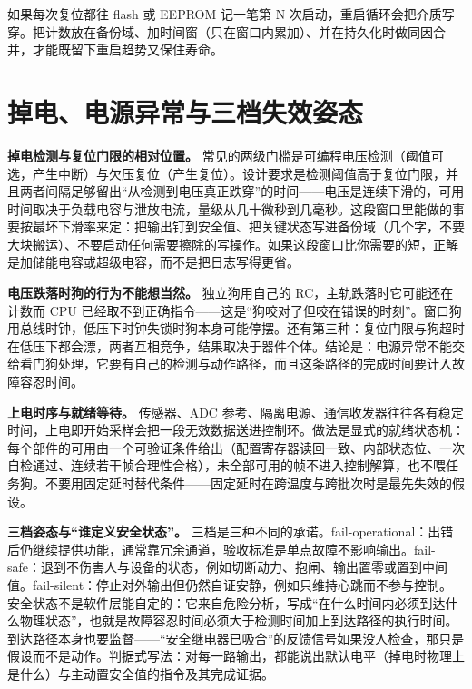 \documentclass[12pt,a4paper,fontset=fandol]{ctexbook}
\begin{document}
\begin{note}[title={复位计数本身是一种磨损}]
如果每次复位都往 flash 或 EEPROM 记一笔第 N 次启动，重启循环会把介质写穿。把计数放在备份域、加时间窗（只在窗口内累加）、并在持久化时做同因合并，才能既留下重启趋势又保住寿命。
\end{note}

\section{掉电、电源异常与三档失效姿态}
\label{sec:ch04-power}

\textbf{掉电检测与复位门限的相对位置。} 常见的两级门槛是可编程电压检测（阈值可选，产生中断）与欠压复位（产生复位）。设计要求是检测阈值高于复位门限，并且两者间隔足够留出``从检测到电压真正跌穿''的时间——电压是连续下滑的，可用时间取决于负载电容与泄放电流，量级从几十微秒到几毫秒。这段窗口里能做的事要按最坏下滑率来定：把输出钉到安全值、把关键状态写进备份域（几个字，不要大块搬运）、不要启动任何需要擦除的写操作。如果这段窗口比你需要的短，正解是加储能电容或超级电容，而不是把日志写得更省。

\textbf{电压跌落时狗的行为不能想当然。} 独立狗用自己的 RC，主轨跌落时它可能还在计数而 CPU 已经取不到正确指令——这是``狗咬对了但咬在错误的时刻''。窗口狗用总线时钟，低压下时钟失锁时狗本身可能停摆。还有第三种：复位门限与狗超时在低压下都会漂，两者互相竞争，结果取决于器件个体。结论是：电源异常不能交给看门狗处理，它要有自己的检测与动作路径，而且这条路径的完成时间要计入故障容忍时间。

\textbf{上电时序与就绪等待。} 传感器、ADC 参考、隔离电源、通信收发器往往各有稳定时间，上电即开始采样会把一段无效数据送进控制环。做法是显式的就绪状态机：每个部件的可用由一个可验证条件给出（配置寄存器读回一致、内部状态位、一次自检通过、连续若干帧合理性合格），未全部可用的帧不进入控制解算，也不喂任务狗。不要用固定延时替代条件——固定延时在跨温度与跨批次时是最先失效的假设。

\textbf{三档姿态与``谁定义安全状态''。} 三档是三种不同的承诺。fail-operational：出错后仍继续提供功能，通常靠冗余通道，验收标准是单点故障不影响输出。fail-safe：退到不伤害人与设备的状态，例如切断动力、抱闸、输出置零或置到中间值。fail-silent：停止对外输出但仍然自证安静，例如只维持心跳而不参与控制。安全状态不是软件层能自定的：它来自危险分析，写成``在什么时间内必须到达什么物理状态''，也就是故障容忍时间必须大于检测时间加上到达路径的执行时间。到达路径本身也要监督——``安全继电器已吸合''的反馈信号如果没人检查，那只是假设而不是动作。判据式写法：对每一路输出，都能说出默认电平（掉电时物理上是什么）与主动置安全值的指令及其完成证据。
\end{document}
